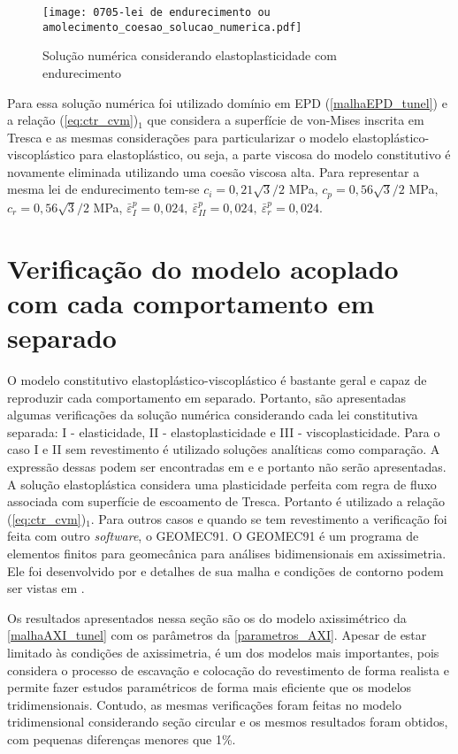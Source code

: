 \begin{figure}[H]
	\begin{center}
		\texttt{[image: 0705-lei de endurecimento ou amolecimento\_coesao\_solucao\_numerica.pdf]}
	\end{center}
	\caption{\label{solucao_numérica_LAJSS}Solução numérica considerando elastoplasticidade com endurecimento}
\end{figure}
Para essa solução numérica foi utilizado domínio em EPD (\autoref{malhaEPD_tunel}) e a relação (\ref{eq:ctr_cvm})$_1$ que considera a superfície de von-Mises inscrita em Tresca e as mesmas considerações para particularizar o modelo elastoplástico-viscoplástico para elastoplástico, ou seja, a parte viscosa do modelo constitutivo é novamente eliminada utilizando uma coesão viscosa alta. Para representar a mesma lei de endurecimento tem-se $c_i = 0,21\sqrt{3}/2$ MPa, $c_p = 0,56\sqrt{3}/2$ MPa, $c_r = 0,56\sqrt{3}/2$ MPa, $\bar \varepsilon^p_{I} = 0,024,~\bar \varepsilon^p_{II} = 0,024,~\bar \varepsilon^p_{r} = 0,024$. 

\section{Verificação do modelo acoplado com cada comportamento em separado}
O modelo constitutivo elastoplástico-viscoplástico é bastante geral e capaz de reproduzir cada comportamento em separado. Portanto, são apresentadas algumas verificações da solução numérica considerando cada lei constitutiva separada: I - elasticidade, II - elastoplasticidade e III - viscoplasticidade. Para o caso I e II sem revestimento é utilizado soluções analíticas como comparação. A expressão dessas podem ser encontradas em  e  e portanto não serão apresentadas. A solução elastoplástica considera uma plasticidade perfeita com regra de fluxo associada com superfície de escoamento de Tresca. Portanto é utilizado a relação (\ref{eq:ctr_cvm})$_1$. Para outros casos e quando se tem revestimento a verificação foi feita com outro \textit{software}, o GEOMEC91. O GEOMEC91 é um programa de elementos finitos para geomecânica para análises bidimensionais em axissimetria. Ele foi desenvolvido por  e detalhes de sua malha e condições de contorno podem ser vistas em .

Os resultados apresentados nessa seção são os do modelo axissimétrico da \autoref{malhaAXI_tunel} com os parâmetros da \autoref{parametros_AXI}. Apesar de estar limitado às condições de axissimetria, é um dos modelos mais importantes, pois considera o processo de escavação e colocação do revestimento de forma realista e permite fazer estudos paramétricos de forma mais eficiente que os modelos tridimensionais. Contudo, as mesmas verificações foram feitas no modelo tridimensional considerando seção circular e os mesmos resultados foram obtidos, com pequenas diferenças menores que 1\%.

